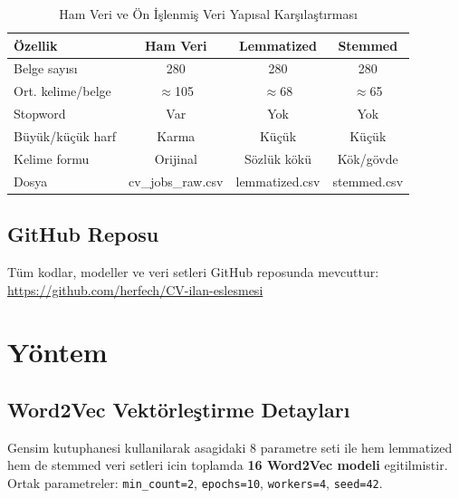 \documentclass[12pt, a4paper]{article}
\begin{document}
\begin{table}[H]
\centering
\caption{Ham Veri ve Ön İşlenmiş Veri Yapısal Karşılaştırması}
\begin{tabular}{lccc}
\toprule
\textbf{Özellik} & \textbf{Ham Veri} & \textbf{Lemmatized} & \textbf{Stemmed} \\
\midrule
Belge sayısı    & 280    & 280    & 280    \\
Ort. kelime/belge & $\approx$105  & $\approx$68     & $\approx$65     \\
Stopword        & Var    & Yok    & Yok    \\
Büyük/küçük harf & Karma & Küçük  & Küçük  \\
Kelime formu    & Orijinal & Sözlük kökü & Kök/gövde \\
Dosya             & cv\_jobs\_raw.csv & lemmatized.csv & stemmed.csv \\
\bottomrule
\end{tabular}
\end{table}

\subsection{GitHub Reposu}

Tüm kodlar, modeller ve veri setleri GitHub reposunda mevcuttur:\\
\url{https://github.com/herfech/CV-ilan-eslesmesi}



\section{Yöntem}

\subsection{Word2Vec Vektörleştirme Detayları}

Gensim kutuphanesi kullanilarak asagidaki 8 parametre seti ile hem lemmatized hem de stemmed veri setleri icin toplamda \textbf{16 Word2Vec modeli} egitilmistir. Ortak parametreler: \texttt{min\_count=2}, \texttt{epochs=10}, \texttt{workers=4}, \texttt{seed=42}.
\end{document}
